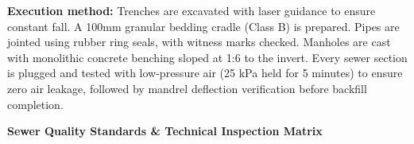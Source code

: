 \noindent
\begin{minipage}[t]{0.185\textwidth}\end{minipage}\hfill
\begin{minipage}[t]{0.185\textwidth}\end{minipage}\hfill
\begin{minipage}[t]{0.185\textwidth}\end{minipage}\hfill
\begin{minipage}[t]{0.185\textwidth}\end{minipage}\hfill
\begin{minipage}[t]{0.185\textwidth}\end{minipage}

\vspace{0.20cm}

\noindent
\begin{tcolorbox}[enhanced, colback=mhoffwhite, colframe=mhlightgray, boxrule=0.7pt, arc=4pt, left=9pt, right=9pt, top=7pt, bottom=7pt, borderline west={3pt}{0pt}{mhgold}, drop shadow=black!4]
    {\fontsize{8.1pt}{11.0pt}\selectfont\color{mhtext}
    \textbf{Execution method:} Trenches are excavated with laser guidance to ensure constant fall. A 100mm granular bedding cradle (Class B) is prepared. Pipes are jointed using rubber ring seals, with witness marks checked. Manholes are cast with monolithic concrete benching sloped at 1:6 to the invert. Every sewer section is plugged and tested with low-pressure air (25 kPa held for 5 minutes) to ensure zero air leakage, followed by mandrel deflection verification before backfill completion.
    }
\end{tcolorbox}

\vfill

\noindent
{\large\bfseries\color{mhnavy} Sewer Quality Standards \& Technical Inspection Matrix}
\vspace{0.10cm}

